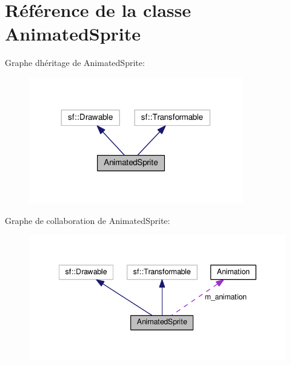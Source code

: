 \hypertarget{class_animated_sprite}{}\section{Référence de la classe Animated\+Sprite}
\label{class_animated_sprite}


Graphe d\textquotesingle{}héritage de Animated\+Sprite\+:\nopagebreak
\begin{figure}[H]
\begin{center}
\leavevmode
\includegraphics[width=264pt]{class_animated_sprite__inherit__graph}
\end{center}
\end{figure}


Graphe de collaboration de Animated\+Sprite\+:\nopagebreak
\begin{figure}[H]
\begin{center}
\leavevmode
\includegraphics[width=342pt]{class_animated_sprite__coll__graph}
\end{center}
\end{figure}
